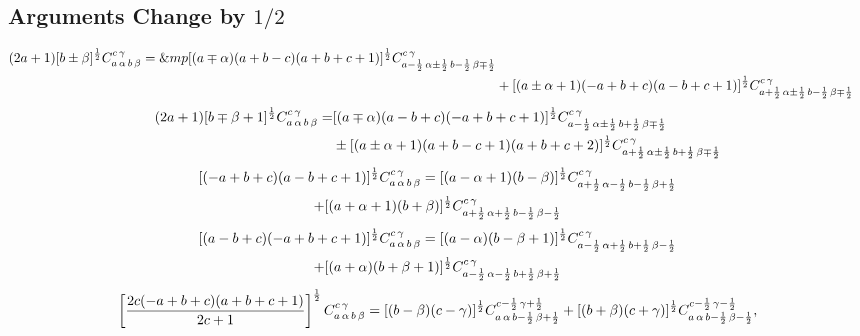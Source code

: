 \subsection{Arguments Change by $1/2$}\label{sec:8.6.3}
\begin{align}
(2 a+1)[b \pm \beta]^{\frac{1}{2}} C_{a\,\alpha\,b\,\beta}^{c\,\gamma}=\&mp[(a \mp \alpha)(a+b-c)(a+b+c+1)]^{\frac{1}{2}} C_{a-\frac{1}{2}\,\alpha \pm \frac{1}{2}\,b-\frac{1}{2}\,\beta \mp \frac{1}{2}}^{c\,\gamma}  \notag\\
&+[(a \pm \alpha+1)(-a+b+c)(a-b+c+1)]^{\frac{1}{2}} C_{a+\frac{1}{2}\,\alpha \pm \frac{1}{2}\,b-\frac{1}{2}\,\beta \mp \frac{1}{2}}^{c\,\gamma}  \label{eq:8:6:9}
\end{align}
\begin{align}
(2 a+1)[b \mp \beta+1]^{\frac{1}{2}} C_{a\,\alpha\,b\,\beta}^{c\,\gamma}=&[(a \mp \alpha)(a-b+c)(-a+b+c+1)]^{\frac{1}{2}} C_{a-\frac{1}{2}\,\alpha \pm \frac{1}{2}\,b+\frac{1}{2}\,\beta \mp \frac{1}{2}}^{c\,\gamma}  \notag\\
&\pm[(a \pm \alpha+1)(a+b-c+1)(a+b+c+2)]^{\frac{1}{2}} C_{a+\frac{1}{2}\,\alpha \pm \frac{1}{2}\,b+\frac{1}{2}\,\beta \mp \frac{1}{2}}^{c\,\gamma}  \label{eq:8:6:10}
\end{align}
\begin{multline}
{[(-a+b+c)(a-b+c+1)]^{\frac{1}{2}} C_{a\,\alpha\,b\,\beta}^{c\,\gamma}=[(a-\alpha+1)(b-\beta)]^{\frac{1}{2}} C_{a+\frac{1}{2}\,\alpha-\frac{1}{2}\,b-\frac{1}{2}\,\beta+\frac{1}{2}}^{c\,\gamma}}  \\
+[(a+\alpha+1)(b+\beta)]^{\frac{1}{2}} C_{a+\frac{1}{2}\,\alpha+\frac{1}{2}\,b-\frac{1}{2}\,\beta-\frac{1}{2}}^{c\,\gamma}  \label{eq:8:6:11}
\end{multline}
\begin{multline}
{[(a-b+c)(-a+b+c+1)]^{\frac{1}{2}} C_{a\,\alpha\,b\,\beta}^{c\,\gamma}=[(a-\alpha)(b-\beta+1)]^{\frac{1}{2}} C_{a-\frac{1}{2}\,\alpha+\frac{1}{2}\,b+\frac{1}{2}\,\beta-\frac{1}{2}}^{c\,\gamma}}  \\
+[(a+\alpha)(b+\beta+1)]^{\frac{1}{2}} C_{a-\frac{1}{2}\,\alpha-\frac{1}{2}\,b+\frac{1}{2}\,\beta+\frac{1}{2}}^{c\,\gamma}  \label{eq:8:6:12}
\end{multline}
\begin{multline}
\left[\frac{2 c(-a+b+c)(a+b+c+1)}{2 c+1}\right]^{\frac{1}{2}}
C_{a\,\alpha\,b\,\beta}^{c\,\gamma}=
[(b-\beta)(c-\gamma)]^{\frac{1}{2}} 
C_{a\,\alpha\,b-\frac{1}{2}\,\beta+\frac{1}{2}}^{c-\frac{1}{2}\,\gamma+\frac{1}{2}}
+[(b+\beta)(c+\gamma)]^\frac{1}{2} C_{a\,\alpha\,b-\frac{1}{2}\,\beta-\frac{1}{2}}^{c-\frac{1}{2}\,\gamma-\frac{1}{2}} , \label{eq:8:6:13}
\end{multline}

